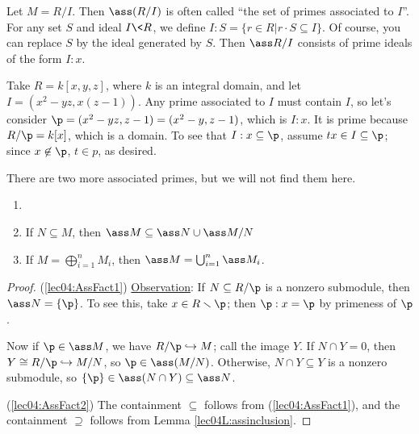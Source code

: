  Let $M = R/I$. Then $\ass (R/I)$ is often called ``the set of primes associated to
 $I$''. For any set $S$ and ideal $I\< R$, we define $I:S = \{r\in R|r\cdot S\subseteq
 I\}$. Of course, you can replace $S$ by the ideal generated by $S$. Then $\ass R/I$
 consists of prime ideals of the form $I:x$.

 \begin{example}
   Take $R=k[x,y,z]$, where $k$ is an integral domain, and let $I = (x^2-yz,x(z-1))$. Any
   prime associated to $I$ must contain $I$, so let's consider
   $\p=(x^2-yz,z-1)=(x^2-y,z-1)$, which is $I:x$. It is prime because $R/\p = k[x]$,
   which is a domain. To see that $I:x\subseteq \p$, assume $tx\in I\subseteq \p$; since
   $x\not\in \p$, $t\in p$, as desired.

   There are two more associated primes, but we will not find them here.
 \end{example}

 \begin{proposition}
   \begin{enumerate}
     \item[]
     \item \label{lec04:AssFact1} If $N\subseteq M$, then
        $\ass M \subseteq \ass N \cup \ass M/N$
     \item \label{lec04:AssFact2} If $M = \bigoplus_{i=1}^n M_i$, then
        $\ass M = \bigcup_{i=1}^n \ass M_i$.
   \end{enumerate}
 \end{proposition}
 \begin{proof}
   (\ref{lec04:AssFact1}) \underline{Observation}: If $N\subseteq R/\p$ is a nonzero
   submodule, then $\ass N=\{\p\}$. To see this, take $x\in R\smallsetminus \p$; then
   $\p:x=\p$ by primeness of $\p$.

   Now if $\p\in \ass M$, we have $R/\p\hookrightarrow M$; call the image $Y$. If $N\cap
   Y=0$, then $Y\cong R/\p\hookrightarrow M/N$, so $\p\in \ass (M/N)$. Otherwise, $N\cap
   Y\subseteq Y$ is a nonzero submodule, so $\{\p\} \in \ass (N\cap Y)\subseteq \ass N$.

   (\ref{lec04:AssFact2}) The containment $\subseteq$ follows from
   (\ref{lec04:AssFact1}), and the containment $\supseteq$ follows from Lemma
   \ref{lec04L:assinclusion}.
 \end{proof}
 \setcounter{lecture}{5}

